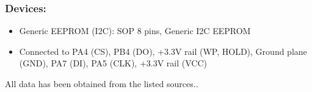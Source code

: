     \subsubsection{Devices:}
    \begin{itemize}
        \item Generic EEPROM (I2C): SOP 8 pins, Generic I2C EEPROM
        \item Connected to PA4 (CS), PB4 (DO), +3.3V rail (WP, HOLD), Ground plane (GND), PA7 (DI), PA5 (CLK), +3.3V rail (VCC)
    \end{itemize}

All data has been obtained from the listed sources.\cite{stm32datasheet,stm32base,stmicro}.